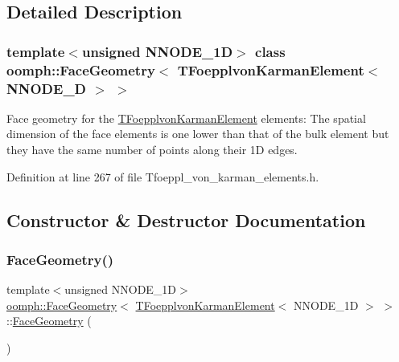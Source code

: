 \subsection{Detailed Description}
\subsubsection*{template$<$unsigned N\+N\+O\+D\+E\+\_\+1D$>$\newline
class oomph\+::\+Face\+Geometry$<$ T\+Foepplvon\+Karman\+Element$<$ N\+N\+O\+D\+E\+\_\+D $>$ $>$}

Face geometry for the \hyperlink{classoomph_1_1TFoepplvonKarmanElement}{T\+Foepplvon\+Karman\+Element} elements\+: The spatial dimension of the face elements is one lower than that of the bulk element but they have the same number of points along their 1D edges. 

Definition at line 267 of file Tfoeppl\+\_\+von\+\_\+karman\+\_\+elements.\+h.



\subsection{Constructor \& Destructor Documentation}
\mbox{\label{classoomph_1_1FaceGeometry_3_01TFoepplvonKarmanElement_3_01NNODE__1D_01_4_01_4_a6105f671ea381b92e06f2ae67118d04b}} 
\subsubsection{\texorpdfstring{Face\+Geometry()}{FaceGeometry()}}
{\footnotesize\ttfamily template$<$unsigned N\+N\+O\+D\+E\+\_\+1D$>$ \\
\hyperlink{classoomph_1_1FaceGeometry}{oomph\+::\+Face\+Geometry}$<$ \hyperlink{classoomph_1_1TFoepplvonKarmanElement}{T\+Foepplvon\+Karman\+Element}$<$ N\+N\+O\+D\+E\+\_\+1D $>$ $>$\+::\hyperlink{classoomph_1_1FaceGeometry}{Face\+Geometry} (\begin{DoxyParamCaption}{ }\end{DoxyParamCaption})\hspace{0.3cm}{\ttfamily [inline]}}



